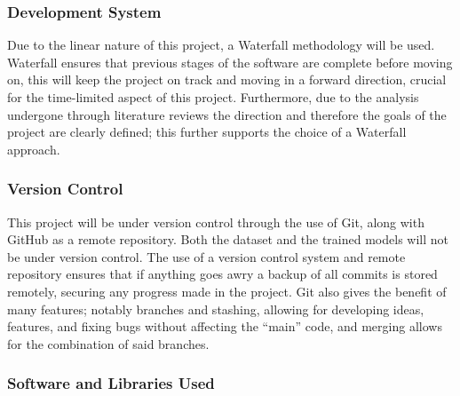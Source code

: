 \documentclass[12pt]{article}
\begin{document}
\subsubsection{Development System}

Due to the linear nature of this project, a Waterfall methodology will be used. Waterfall ensures that previous stages of the software are complete before moving on, this will keep the project on track and moving in a forward direction, crucial for the time-limited aspect of this project. Furthermore, due to the analysis undergone through literature reviews the direction and therefore the goals of the project are clearly defined; this further supports the choice of a Waterfall approach.

\subsubsection{Version Control}

This project will be under version control through the use of Git, along with GitHub as a remote repository. Both the dataset and the trained models will not be under version control. The use of a version control system and remote repository ensures that if anything goes awry a backup of all commits is stored remotely, securing any progress made in the project. Git also gives the benefit of many features; notably branches and stashing, allowing for developing ideas, features, and fixing bugs without affecting the ``main'' code, and merging allows for the combination of said branches.

\subsubsection{Software and Libraries Used}
\end{document}
